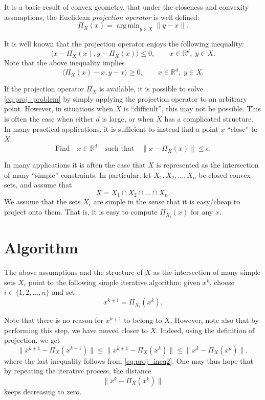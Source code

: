 \documentclass[11pt]{book}
\newcommand{\R}{\mathbb{R}}
\DeclareMathOperator*{\argmin}{arg\,min}
\theoremstyle{definition}
\begin{document}
	It is a basic result of convex geometry, that under the  closeness and convexity assumptions, the Euclidean {\em projection operator} is well defined:
	\begin{equation}\label{eq:proj}
	\Pi_{X}(x) = \argmin_{y \in X}\|y-x\|.
	\end{equation}
	
	
	It is well known that the projection operator enjoys the following inequality:
	\begin{equation} \label{eq:proj_ineq}  \langle x - \Pi_X(x), y - \Pi_X(x) \rangle \leq 0, \qquad x\in \R^d, \; y \in X.\end{equation}
	Note that the above inequality implies
	\begin{equation}\label{eq:proj_ineq2} \langle \Pi_X(x) - x, y- x \rangle \geq 0, \qquad x\in \R^d, \; y\in X.\end{equation}
	
	If the projection operator $\Pi_X$ is available, it is possible to solve \eqref{eq:proj_problem} by simply applying the projection operator to an arbitrary point. However, in situations when  $X$ is ``difficult'', this may not be possible. This is often the case when either $d$ is large, or when  $X$ has a complicated structure. In many practical applications, it is sufficient to instead find a point $x$ ``close'' to $X$: 
	\[\text{Find} \quad x\in \R^d \quad \text{such that} \quad \|x - \Pi_X(x)\| \leq \epsilon.\]
	
	
	In many applications it is often the case that $X$ is represented as the intersection of many ``simple'' constraints. In particular, let $X_1 , X_2 , \dots, X_n$ be closed convex sets, and assume that 
	\begin{equation} \label{eq:intersect} X = X_1 \cap X_2 \cap \dots \cap X_n.\end{equation}
	We assume that the sets $X_i$ are simple in the sense that it is easy/cheap to  project onto them. That is, it is easy to compute $\Pi_{X_i}(x)$ for any $x$.
	
	\section{Algorithm}
	
	The above assumptions and the structure of $X$ as the intersection of many simple sets $X_i$ point to the following simple iterative algorithm: given $x^k$, choose $i\in \{1,2,\dots, n\}$ and set 
	\[x^{k+1} = \Pi_{X_i}(x^k).\]
	
	Note that there is no reason for $x^{k+1}$ to belong to $X$. However, note also that by performing this step, we have moved closer to $X$.  Indeed,  using the definition of projection, we get
	\[\|x^{k+1}-\Pi_X(x^{k+1})\| \leq \|x^{k+1} - \Pi_{X}(x^k) \| \leq \|x^k - \Pi_{X}(x^k) \|,\]
	where the last inequality follows from \eqref{eq:proj_ineq2}. One may thus hope that by repeating the iterative process, the distance
	\[\|x^{k}-\Pi_X(x^{k})\|\] keeps decreasing to zero.
	
\end{document}
